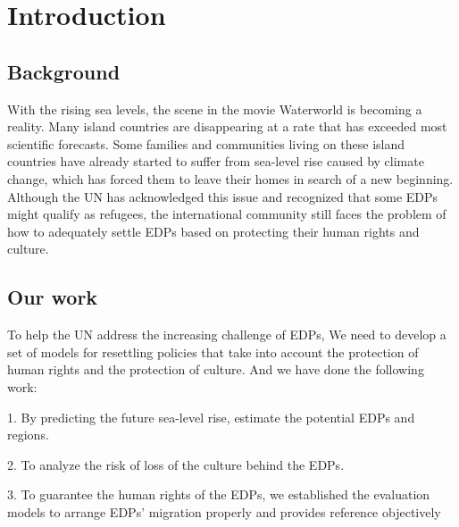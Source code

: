\documentclass[12pt]{article}  %
\begin{document}
\maketitle  %
\tableofcontents  %


\section{Introduction}
\subsection{Background}



With the rising sea levels, the scene in the movie Waterworld is becoming a reality. Many island countries are disappearing at a rate that has exceeded most scientific forecasts. Some families and communities living on these island countries have already started to suffer from sea-level rise caused by climate change, which has forced them to leave their homes in search of a new beginning. Although the UN has acknowledged this issue and recognized that some EDPs might qualify as refugees, the international community still faces the problem of how to adequately settle EDPs based on protecting their human rights and culture.




\subsection{Our work}
To help the UN address the increasing challenge of EDPs, We need to develop a set of models for resettling policies that take into account the protection of human rights and the protection of culture. And we have done the following work: 

1. By predicting the future sea-level rise, estimate the potential EDPs and regions.

2. To analyze the risk of loss of the culture behind the EDPs. 

3. To guarantee the human rights of the EDPs, we established the evaluation models to arrange EDPs’ migration properly and provides  reference objectively 
\end{document}

